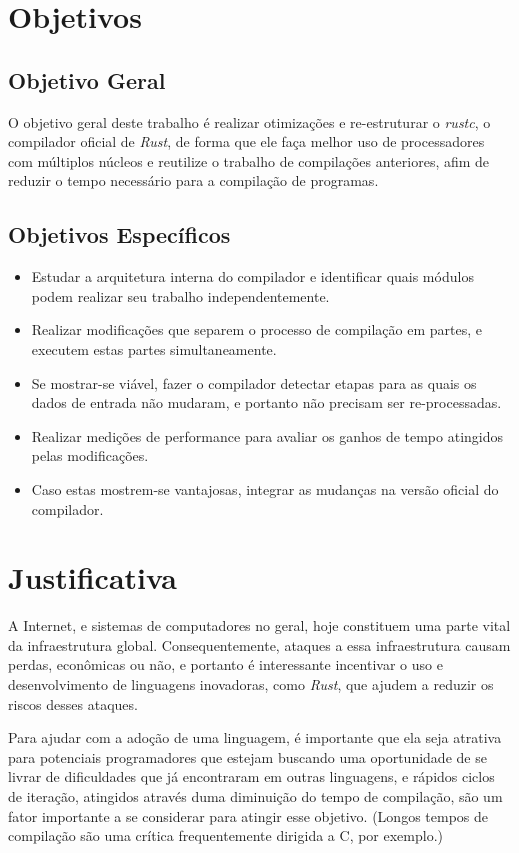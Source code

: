 \documentclass[12pt]{article}
\def\Cpp{{C\nolinebreak[4]\hspace{-.05em}\raisebox{.4ex}{\tiny\bf ++}}}
\begin{document}
\section{Objetivos}

\subsection{Objetivo Geral}

O objetivo geral deste trabalho é realizar otimizações e re-estruturar o \emph{rustc}, o compilador oficial de \emph{Rust}, de forma que ele faça melhor uso de processadores com múltiplos núcleos e reutilize o trabalho de compilações anteriores, afim de reduzir o tempo necessário para a compilação de programas.

\subsection{Objetivos Específicos}
\begin{itemize}
	\item Estudar a arquitetura interna do compilador e identificar quais módulos podem realizar seu trabalho independentemente.
	\item Realizar modificações que separem o processo de compilação em partes, e executem estas partes simultaneamente.
	\item Se mostrar-se viável, fazer o compilador detectar etapas para as quais os dados de entrada não mudaram, e portanto não precisam ser re-processadas.
	\item Realizar medições de performance para avaliar os ganhos de tempo atingidos pelas modificações.
	\item Caso estas mostrem-se vantajosas, integrar as mudanças na versão oficial do compilador.
\end{itemize}

\section{Justificativa}

A Internet, e sistemas de computadores no geral, hoje constituem uma parte vital da infraestrutura global. Consequentemente, ataques a essa infraestrutura causam perdas, econômicas ou não, e portanto é interessante incentivar o uso e desenvolvimento de linguagens inovadoras, como \emph{Rust}, que ajudem a reduzir os riscos desses ataques.

Para ajudar com a adoção de uma linguagem, é importante que ela seja atrativa para potenciais programadores que estejam buscando uma oportunidade de se livrar de dificuldades que já encontraram em outras linguagens, e rápidos ciclos de iteração, atingidos através duma diminuição do tempo de compilação, são um fator importante a se considerar para atingir esse objetivo. (Longos tempos de compilação são uma crítica frequentemente dirigida a \Cpp, por exemplo.)
\end{document}

